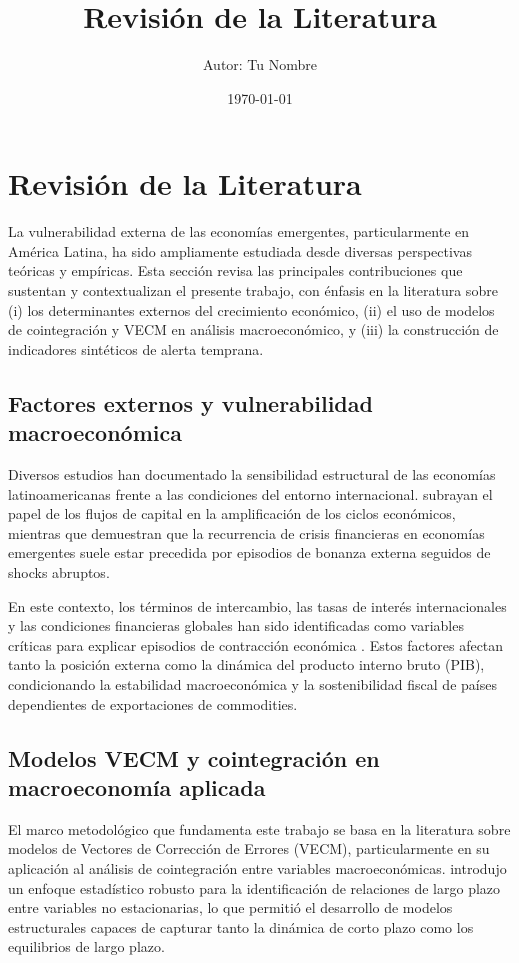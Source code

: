 \documentclass[12pt]{article}
\title{Revisión de la Literatura}
\author{Autor: Tu Nombre}
\date{\today}
\begin{document}
\maketitle
\tableofcontents
\newpage

\section{Revisión de la Literatura}

La vulnerabilidad externa de las economías emergentes, particularmente en América Latina, ha sido ampliamente estudiada desde diversas perspectivas teóricas y empíricas. Esta sección revisa las principales contribuciones que sustentan y contextualizan el presente trabajo, con énfasis en la literatura sobre (i) los determinantes externos del crecimiento económico, (ii) el uso de modelos de cointegración y VECM en análisis macroeconómico, y (iii) la construcción de indicadores sintéticos de alerta temprana.

\subsection{Factores externos y vulnerabilidad macroeconómica}

Diversos estudios han documentado la sensibilidad estructural de las economías latinoamericanas frente a las condiciones del entorno internacional. \cite{calvo1993} subrayan el papel de los flujos de capital en la amplificación de los ciclos económicos, mientras que \cite{reinhart2009} demuestran que la recurrencia de crisis financieras en economías emergentes suele estar precedida por episodios de bonanza externa seguidos de shocks abruptos.

En este contexto, los términos de intercambio, las tasas de interés internacionales y las condiciones financieras globales han sido identificadas como variables críticas para explicar episodios de contracción económica \cite{frankel2012}. Estos factores afectan tanto la posición externa como la dinámica del producto interno bruto (PIB), condicionando la estabilidad macroeconómica y la sostenibilidad fiscal de países dependientes de exportaciones de commodities.

\subsection{Modelos VECM y cointegración en macroeconomía aplicada}

El marco metodológico que fundamenta este trabajo se basa en la literatura sobre modelos de Vectores de Corrección de Errores (VECM), particularmente en su aplicación al análisis de cointegración entre variables macroeconómicas. \cite{johansen1995} introdujo un enfoque estadístico robusto para la identificación de relaciones de largo plazo entre variables no estacionarias, lo que permitió el desarrollo de modelos estructurales capaces de capturar tanto la dinámica de corto plazo como los equilibrios de largo plazo.
\end{document}
